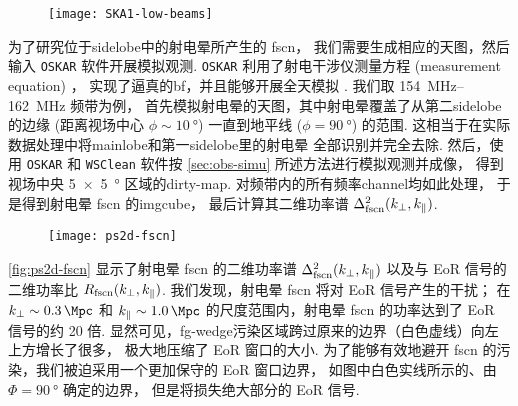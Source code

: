 \begin{figure}[htp]
  \centering
  \texttt{[image: SKA1-low-beams]}
  \label{fig:ska-beams}
\end{figure}

为了研究位于\ac{sidelobe}中的射电晕所产生的 \ac{fscn}，
我们需要生成相应的天图，然后输入 \texttt{OSKAR} 软件开展模拟观测.
\texttt{OSKAR} 利用了射电干涉仪测量方程 (measurement equation) \cite{smirnov2011}，
实现了逼真的\ac{bf}，并且能够开展全天模拟 \cite{mort2010}.
我们取 \SIrange{154}{162}{\MHz} 频带为例，
首先模拟射电晕的天图，其中射电晕覆盖了从第二\ac{sidelobe}的边缘
(距离视场中心 $\phi \sim \SI{10}{\degree}$)
一直到地平线 ($\phi = \SI{90}{\degree}$) 的范围.
这相当于在实际数据处理中将\ac{mainlobe}和第一\ac{sidelobe}里的射电晕
全部识别并完全去除.
然后，使用 \texttt{OSKAR} 和 \texttt{WSClean} 软件按
\autoref{sec:obs-simu} 所述方法进行模拟观测并成像，
得到视场中央 \SI{5 x 5}{\degree} 区域的\ac{dirty-map}.
对频带内的所有频率\ac{channel}均如此处理，
于是得到射电晕 \ac{fscn} 的\ac{imgcube}，
最后计算其二维功率谱 $\Delta^2_{\mathrm{fscn}}(k_{\perp}, k_{\parallel})$.

\begin{figure}[htp]
  \centering
  \texttt{[image: ps2d-fscn]}
  \label{fig:ps2d-fscn}
\end{figure}

\autoref{fig:ps2d-fscn} 显示了射电晕 \ac{fscn}
的二维功率谱 $\Delta^2_{\mathrm{fscn}}(k_{\perp}, k_{\parallel})$
以及与 EoR 信号的二维功率比 $R_{\mathrm{fscn}}(k_{\perp}, k_{\parallel})$.
我们发现，射电晕 \ac{fscn} 将对 EoR 信号产生的干扰；
在 $\kperp \sim \SI{0.3}{\per\Mpc}$ 和 $\klos \sim \SI{1.0}{\per\Mpc}$
的尺度范围内，射电晕 \ac{fscn} 的功率达到了 EoR 信号的约 20 倍.
显然可见，\ac{fg-wedge}污染区域跨过原来的边界（白色虚线）向左上方增长了很多，
极大地压缩了 EoR 窗口的大小.
为了能够有效地避开 \ac{fscn} 的污染，我们被迫采用一个更加保守的 EoR 窗口边界，
如图中白色实线所示的、由 $\Phi = \SI{90}{\degree}$ 确定的边界，
但是将损失绝大部分的 EoR 信号.

